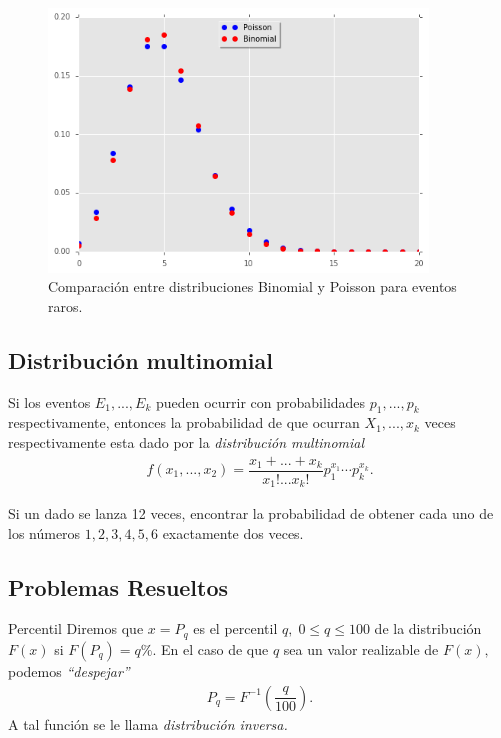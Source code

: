 \begin{figure}
 \centering
 \includegraphics[height=7cm]{./pe/binVsPoi.png}
 \caption{Comparación entre distribuciones Binomial y Poisson para eventos raros.}
\end{figure}



\subsection{Distribución multinomial}

 Si los eventos $E_{1},...,E_{k}$ pueden ocurrir con probabilidades $p_{1},...,p_{k}$ respectivamente, entonces la probabilidad de que ocurran $X_{1},...,x_{k}$ veces respectivamente esta dado por la \emph{distribución multinomial}
 \begin{align}
  \label{eq:7.6}
  f\left( x_{1},...,x_{2} \right)=
  \dfrac{x_{1}+...+x_{k}}{x_{1}!...x_{k}!}p_{1}^{x_{1}}\cdots p_{k}^{x_{k}}.
 \end{align}



 \begin{ejemplo}
  \label{exmp:7.7}
Si un dado se lanza 12 veces, encontrar la probabilidad de obtener cada uno de los números $1,2,3,4,5,6$ exactamente dos veces.
 \end{ejemplo}



\subsection{Problemas Resueltos}
{Percentil}
 Diremos que $x=P_{q}$ es el percentil $q, \; 0\leq q \leq 100$ de la distribución $F(x)$ si $F(P_{q})=q\%.$  En el caso de que $q$ sea un valor realizable de $F(x),$ podemos \emph{``despejar''}
 \begin{align}
  P_{q}=F^{-1}\left( \dfrac{q}{100} \right).
 \end{align}
 A tal función se le llama \emph{distribución inversa.}



